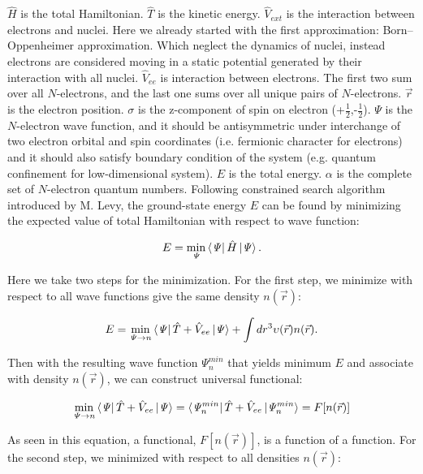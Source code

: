 $\hat{H}$ is the total Hamiltonian. $\hat{T}$ is the kinetic energy. $\hat{V}_{ext}$ is the interaction between electrons and nuclei. Here we already started with the first approximation: Born–Oppenheimer approximation\cite{Born1927}. Which neglect the dynamics of nuclei, instead electrons are considered moving in a static potential generated by their interaction with all nuclei. $\hat{V}_{ee}$ is interaction between electrons. The first two sum over all $N$-electrons, and the last one sums over all unique pairs of $N$-electrons. $\vec{r}$ is the electron position. $\sigma$ is the z-component of spin on electron (+$\frac{1}{2}$,-$\frac{1}{2}$). $\mathit{\Psi}$ is the $N$-electron wave function, and it should be antisymmetric under interchange of two electron orbital and spin coordinates (i.e. fermionic character for electrons) and it should also satisfy boundary condition of the system (e.g. quantum confinement for low-dimensional system). $E$ is the total energy. $\alpha$ is the complete set of $N$-electron quantum numbers. Following constrained search algorithm introduced by M. Levy\cite{Levy1979}, the ground-state energy $E$ can be found by minimizing the expected value of total Hamiltonian with respect to wave function:

\begin{equation}
E=\min_\mathit{\Psi}\bra{\mathit{\Psi}}\hat{H}\ket{\mathit{\Psi}}.
\end{equation}

Here we take two steps for the minimization. For the first step, we minimize with respect to all wave functions give the same density $n(\vec{r})$:

\begin{equation}
E=\min_{\mathit{\Psi}\rightarrow n}\bra{\mathit{\Psi}}\hat{T}+\hat{V}_{ee}\ket{\mathit{\Psi}}+\int dr^3\upsilon(\vec{r})n(\vec{r}).
\end{equation}

Then with the resulting wave function $\mathit{\Psi}^{min}_n$ that yields minimum $E$ and associate with density $n(\vec{r})$, we can construct universal functional:

\begin{equation}
\min_{\mathit{\Psi}\rightarrow n}\bra{\mathit{\Psi}}\hat{T}+\hat{V}_{ee}\ket{\mathit{\Psi}}=\bra{\mathit{\Psi}^{min}_n}\hat{T}+\hat{V}_{ee}\ket{\mathit{\Psi}^{min}_n}=F[n(\vec{r})]
\end{equation}

As seen in this equation, a functional, $F[n(\vec{r})]$, is a function of a function. For the second step, we minimized with respect to all densities $n(\vec{r})$:


